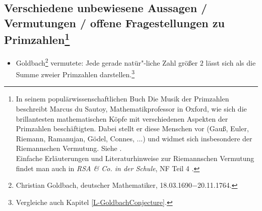\begin{refsegment}



\newpage
\subsection[Verschiedene unbewiesene Aussagen / Vermutungen / offene Fragestellungen zu Primzahlen]
           {Verschiedene unbewiesene Aussagen / Vermutungen / offene Fragestellungen zu Primzahlen\footnote{%
  In seinem populärwissenschaftlichen Buch \glqq Die Musik der Primzahlen\grqq~
  beschreibt Marcus du Sautoy, Mathematikprofessor in Oxford, wie sich die
  brillantesten mathematischen Köpfe mit verschiedenen Aspekten der Primzahlen
  beschäftigten. Dabei stellt er diese Menschen vor (Gauß, Euler, Riemann, Ramanujan,
  Gödel, Connes, ...) und widmet sich insbesondere der \glqq Riemannschen Vermutung\grqq.
  Siehe \cite{duSautoy2005}.\\
  Einfache Erläuterungen und Literaturhinweise zur Riemannschen Vermutung findet man
  auch in {\em RSA \& Co. in der Schule}, NF Teil 4 \cite{Witten2010a}.
}
}

\begin{itemize}
  \item Goldbach\footnote{%
     Christian Goldbach, deutscher Mathematiker,
     18.03.1690$-$20.11.1764. }
     vermutete:
     Jede gerade natür"-liche Zahl größer $2$ lässt sich als die Summe
     zweier Primzahlen darstellen.\footnote{Vergleiche auch Kapitel
     \ref{L-GoldbachConjecture}.}



\end{itemize}
\end{refsegment}
